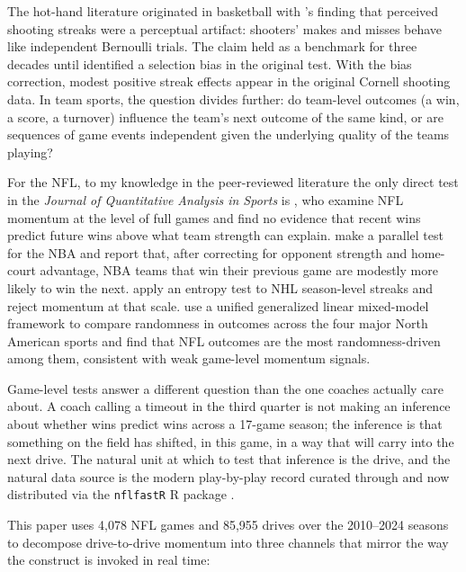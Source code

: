 \documentclass[11pt]{article}
\begin{document}
The hot-hand literature originated in basketball with
\citet{gilovich1985hot}'s finding that perceived shooting streaks were a
perceptual artifact: shooters' makes and misses behave like independent
Bernoulli trials. The claim held as a benchmark for three decades until
\citet{miller2018surprised} identified a selection bias in the original test.
With the bias correction, modest positive streak effects appear in the
original Cornell shooting data. In team sports, the question divides further:
do team-level outcomes (a win, a score, a turnover) influence the team's next
outcome of the same kind, or are sequences of game events independent given
the underlying quality of the teams playing?

For the NFL, to my knowledge in the peer-reviewed literature the only direct test in the \emph{Journal of
Quantitative Analysis in Sports} is \citet{fry2012searching}, who examine NFL
momentum at the level of full games and find no evidence that recent wins
predict future wins above what team strength can explain.
\citet{arkes2011finally} make a parallel test for the NBA and report that,
after correcting for opponent strength and home-court advantage, NBA teams
that win their previous game are modestly more likely to win the next.
\citet{steeger2021winning} apply an entropy test to NHL season-level streaks
and reject momentum at that scale. \citet{lopez2018often} use a unified
generalized linear mixed-model framework to compare randomness in outcomes
across the four major North American sports and find that NFL outcomes are
the most randomness-driven among them, consistent with weak game-level
momentum signals.

Game-level tests answer a different question than the one coaches actually
care about. A coach calling a timeout in the third quarter is not making an
inference about whether wins predict wins across a 17-game season; the
inference is that something on the field has shifted, in this game, in a way
that will carry into the next drive. The natural unit at which to test that
inference is the drive, and the natural data source is the modern play-by-play
record curated through \citet{yurko2018nflwar} and now distributed via the
\texttt{nflfastR} R package \citep{nflfastr2024}.

This paper uses 4{,}078 NFL games and 85{,}955 drives over the 2010--2024
seasons to decompose drive-to-drive momentum into three channels that mirror
the way the construct is invoked in real time:
\end{document}

